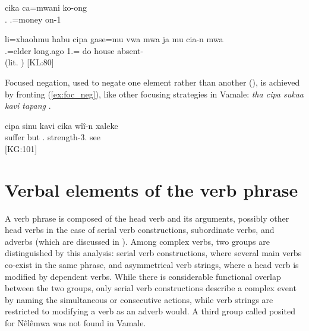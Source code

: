 \ea \label{ex:cika}
 \gll cika ca=mwani ko-ong\\ 
 . .=money on-1\\ 
\glt {}
\z



\ea \label{ex:cian}
\gll li=xhaohmu habu cipa gase=mu vwa mwa ja mu cia-n mwa\\ 
 .=elder long.ago  1.= do house   absent- \\ 
\glt {} (lit. ) {[KL:80]}
\z

Focused negation, used to negate one element rather than another (), is achieved by fronting (\ref{ex:foc_neg}), like other focusing strategies in Vamale: \textit{tha cipa sukaa kavi tapang}  . 

\ea \label{ex:foc_neg}
\gll cipa sinu kavi cika wîî-n xaleke\\ 
  suffer but . strength-3. see\\ 
\glt {} {[KG:101]}
\z





\section{Verbal elements of the verb phrase}

A verb phrase is composed of the head verb and its arguments, possibly other head verbs in the case of serial verb constructions, subordinate verbs, and adverbs (which are discussed in ). Among complex verbs, two groups are distinguished by this analysis: serial verb constructions, where several main verbs co-exist in the same phrase, and asymmetrical verb strings, where a head verb is modified by dependent verbs. While there is considerable functional overlap between the two groups, only serial verb constructions describe a complex event by naming the simultaneous or consecutive actions, while verb strings are restricted to modifying a verb as an adverb would. A third group called  posited for Nêlêmwa was not found in Vamale. %

